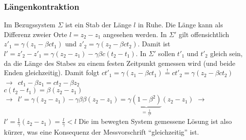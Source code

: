 \documentclass[oneside]{book}
\theoremstyle{definition}
\newcommand{\conseq}{$\rightarrow$~}
\begin{document}
\subsubsection{Längenkontraktion}
Im Bezugssystem $\Sigma$ ist ein Stab der Länge $l$ in Ruhe. Die Länge kann als Differenz zweier Orte $l = z_2 - z_1$ angesehen werden. In $\Sigma'$ gilt offensichtlich $z'_1 = \gamma (z_1 - \beta c t_1)$ und $z'_2 = \gamma (z_2 - \beta c t_2)$. Damit ist $l' = z'_2 - z'_1 = \gamma (z_2 - z_1) - \gamma \beta c (t_2 - t_1)$.
In $\Sigma'$ sollen $t'_1$ und $t'_2$ gleich sein, da die Länge des Stabes zu einem festen Zeitpunkt gemessen wird (und beide Enden gleichzeitig). Damit folgt
$c t'_1 = \gamma (z_1 - \beta c t_1) \overset{!}{=} c t'_2 = \gamma (z_2 - \beta c t_2)$\\
\conseq $c t_1 - \beta z_1 = c t_2 - \beta z_2$ \\ $c(t_2 - t_1) = \beta (z_2 - z_1)$\\
\conseq $l' = \gamma (z_2 - z_1) - \gamma \beta \beta (z_2 - z_1) = \gamma \underbrace{(1 - \beta^2)}_{=\frac{1}{\gamma^2}} (z_2 - z_1)$
\conseq $l' = \frac{1}{\gamma} (z_2 - z_1) = \frac{l}{\gamma} < l$
Die im bewegten System gemessene Lösung ist also kürzer, was eine Konsequenz der Messvorschrift "`gleichzeitig"' ist.
\end{document}
